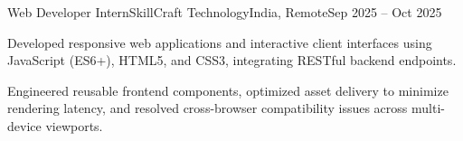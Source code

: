 \begin{cventry}{Web Developer Intern}{SkillCraft Technology}{India, Remote}{Sep 2025 -- Oct 2025}
    \item Developed responsive web applications and interactive client interfaces using JavaScript (ES6+), HTML5, and CSS3, integrating RESTful backend endpoints.
    \item Engineered reusable frontend components, optimized asset delivery to minimize rendering latency, and resolved cross-browser compatibility issues across multi-device viewports.
\end{cventry}